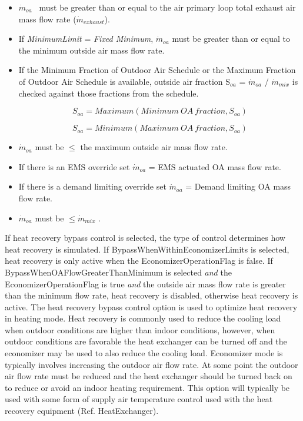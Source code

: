 \begin{itemize}
\item  \({\dot m_{oa}}\) ~must be greater than or equal to the air primary loop total exhaust air mass flow rate (\({\dot m_{exhaust}}\)).

\item  If \emph{MinimumLimit} = \emph{Fixed Minimum}, \({\dot m_{oa}}\) must be greater than or equal to the minimum outside air mass flow rate.

\item  If the Minimum Fraction of Outdoor Air Schedule or the Maximum Fraction of Outdoor Air Schedule is available, outside air fraction S\(_{oa}\) = \({\dot m_{oa}}\) / \({\dot m_{mix}}\) is checked against those fractions from the schedule.

\begin{equation}
S_{oa} = Maximum(Minimum~OA~fraction, S_{oa})
\end{equation}

\begin{equation}
S_{oa} = Minimum(Maximum~OA~fraction, S_{oa})
\end{equation}

\item  \({\dot m_{oa}}\) must be \(\le\) the maximum outside air mass flow rate.

\item  If there is an EMS override set \({\dot m_{oa}}\) = EMS actuated OA mass flow rate.

\item  If there is a demand limiting override set \({\dot m_{oa}}\) = Demand limiting OA mass flow rate.

\item  \({\dot m_{oa}}\) must be \(\le {\dot m_{mix}}\) .

\end{itemize}

If heat recovery bypass control is selected, the type of control determines how heat recovery is simulated. If BypassWhenWithinEconomizerLimits is selected, heat recovery is only active when the EconomizerOperationFlag is false. If BypassWhenOAFlowGreaterThanMinimum is selected \emph{and} the EconomizerOperationFlag is true \emph{and} the outside air mass flow rate is greater than the minimum flow rate, heat recovery is disabled, otherwise heat recovery is active. The heat recovery bypass control option is used to optimize heat recovery in heating mode. Heat recovery is commonly used to reduce the cooling load when outdoor conditions are higher than indoor conditions, however, when outdoor conditions are favorable the heat exchanger can be turned off and the economizer may be used to also reduce the cooling load. Economizer mode is typically involves increasing the outdoor air flow rate. At some point the outdoor air flow rate must be reduced and the heat exchanger should be turned back on to reduce or avoid an indoor heating requirement. This option will typically be used with some form of supply air temperature control used with the heat recovery equipment (Ref. HeatExchanger).

